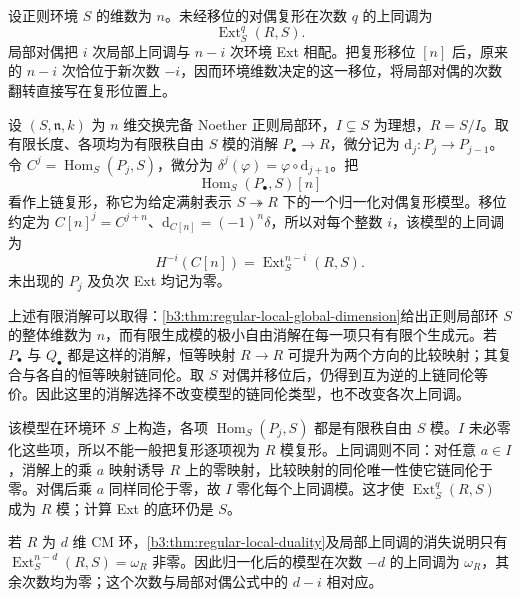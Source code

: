 \ProseParagraphBreak
设正则环境 \(S\) 的维数为 \(n\)。未经移位的对偶复形在次数 \(q\) 的上同调为
\[
	\operatorname{Ext}_S^q(R,S).
\]
局部对偶把 \(i\) 次局部上同调与 \(n-i\) 次环境 Ext 相配。把复形移位 \([n]\) 后，原来的 \(n-i\) 次恰位于新次数 \(-i\)，因而环境维数决定的这一移位，将局部对偶的次数翻转直接写在复形位置上。

\begin{definition}\label{b3:def:regular-cover-dual-complex}
	设 \((S,\mathfrak n,k)\) 为 \(n\) 维交换完备 Noether 正则局部环，\(I\subsetneq S\) 为理想，\(R=S/I\)。取有限长度、各项均为有限秩自由 \(S\) 模的消解 \(P_\bullet\rightarrow R\)，微分记为 \(\mathrm d_j:P_j\rightarrow P_{j-1}\)。令 \(C^j=\operatorname{Hom}_S(P_j,S)\)，微分为 \(\delta^j(\varphi)=\varphi\circ\mathrm d_{j+1}\)。把
	\[
		\operatorname{Hom}_S(P_\bullet,S)[n]
	\]
	看作上链复形，称它为给定满射表示 \(S\twoheadrightarrow R\) 下的一个归一化对偶复形模型。移位约定为 \(C[n]^j=C^{j+n}\)、\(\mathrm{d}_{C[n]}=(-1)^n\delta\)，所以对每个整数 \(i\)，该模型的上同调为
	\[
		H^{-i}(C[n])=\operatorname{Ext}_S^{n-i}(R,S).
	\]
	未出现的 \(P_j\) 及负次 Ext 均记为零。
\end{definition}

上述有限消解可以取得：\cref{b3:thm:regular-local-global-dimension}给出正则局部环 \(S\) 的整体维数为 \(n\)，而有限生成模的极小自由消解在每一项只有有限个生成元。若 \(P_\bullet\) 与 \(Q_\bullet\) 都是这样的消解，恒等映射 \(R\rightarrow R\) 可提升为两个方向的比较映射；其复合与各自的恒等映射链同伦。取 \(S\) 对偶并移位后，仍得到互为逆的上链同伦等价。因此这里的消解选择不改变模型的链同伦类型，也不改变各次上同调。

\ProseParagraphBreak
该模型在环境环 \(S\) 上构造，各项 \(\operatorname{Hom}_S(P_j,S)\) 都是有限秩自由 \(S\) 模。\(I\) 未必零化这些项，所以不能一般把复形逐项视为 \(R\) 模复形。上同调则不同：对任意 \(a\in I\)，消解上的乘 \(a\) 映射诱导 \(R\) 上的零映射，比较映射的同伦唯一性使它链同伦于零。对偶后乘 \(a\) 同样同伦于零，故 \(I\) 零化每个上同调模。这才使 \(\operatorname{Ext}_S^q(R,S)\) 成为 \(R\) 模；计算 Ext 的底环仍是 \(S\)。

\ProseParagraphBreak
若 \(R\) 为 \(d\) 维 CM 环，\cref{b3:thm:regular-local-duality}及局部上同调的消失说明只有 \(\operatorname{Ext}_S^{n-d}(R,S)=\omega_R\) 非零。因此归一化后的模型在次数 \(-d\) 的上同调为 \(\omega_R\)，其余次数均为零；这个次数与局部对偶公式中的 \(d-i\) 相对应。

